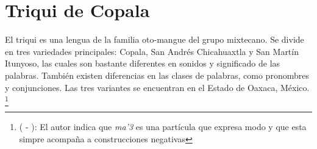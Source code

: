 \section*{Triqui de Copala}

\noindent El triqui es una lengua de la familia oto-mangue del grupo mixtecano. Se divide en tres variedades principales: Copala, San Andrés Chicahuaxtla y San Martín Itunyoso, las cuales son bastante diferentes en sonidos y significado de las palabras. También existen diferencias en las clases de palabras, como pronombres y conjunciones. Las tres variantes se encuentran en el Estado de Oaxaca, México.
\footnote{( - ): El autor indica que {\setmainfont{Charis SIL} \textit{ma'3}} es una partícula que expresa modo y que esta simpre acompaña a construcciones negativas}
\vspace{0.4cm}

